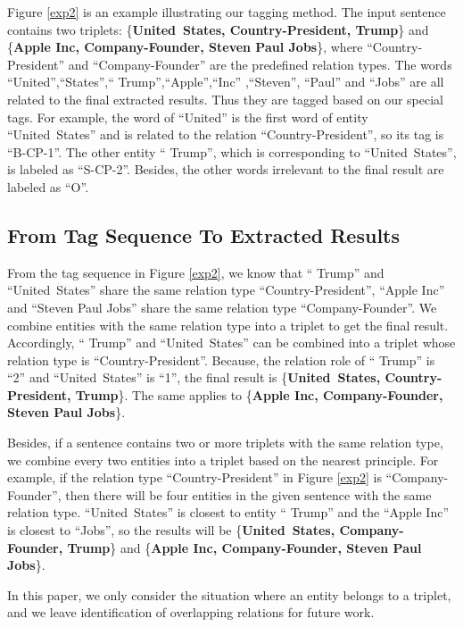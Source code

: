 \documentclass[11pt,a4paper]{article}
\begin{document}
Figure \ref{exp2} is an example illustrating our tagging method.
The input sentence contains two triplets:
\{\textbf{United~States, Country-President,  Trump}\} and \{\textbf{Apple Inc, Company-Founder, Steven Paul Jobs}\}, where
 ``Country-President'' and ``Company-Founder'' are the predefined relation types.
 The words ``United'',``States'',`` Trump'',``Apple'',``Inc'' ,``Steven'', ``Paul'' and ``Jobs'' are all related to the final extracted results. Thus they are tagged based on our special tags.
 For example, the word of ``United'' is the first word of entity ``United~States'' and
 is related to the relation ``Country-President'', so its tag is ``B-CP-1''.
The other entity `` Trump'', which is corresponding to ``United~States'', is labeled as ``S-CP-2''.
Besides, the other words irrelevant to the final result are labeled as ``O''.
 \subsection{From Tag Sequence To Extracted Results}
 From the tag sequence in Figure \ref{exp2},
 we know that `` Trump'' and ``United~States'' share the same relation type ``Country-President'',
 ``Apple Inc'' and ``Steven Paul Jobs'' share the same relation type ``Company-Founder''.
  We combine entities with the same relation type into a triplet to get the final result.
  Accordingly, `` Trump'' and ``United~States'' can be combined into a triplet whose relation type is ``Country-President''.
  Because, the relation role of `` Trump'' is ``2'' and ``United~States'' is ``1'', the final result is
\{\textbf{United~States, Country-President,  Trump}\}. The same applies to \{\textbf{Apple Inc, Company-Founder, Steven Paul Jobs}\}.

 Besides, if a sentence contains two or more triplets with the same relation type,
 we combine every two entities into a triplet based on the nearest principle.
 For example, if the relation type ``Country-President'' in Figure \ref{exp2} is ``Company-Founder'',
 then there will be four entities in the given sentence with the same relation type.
``United~States'' is closest to entity `` Trump'' and the ``Apple Inc'' is closest to ``Jobs'',
so the results will be \{\textbf{United~States, Company-Founder, Trump}\} and \{\textbf{Apple Inc, Company-Founder, Steven Paul Jobs}\}.

 In this paper, we only consider the situation where an entity belongs to a triplet,
 and we leave identification of overlapping relations for future work.
\end{document}
